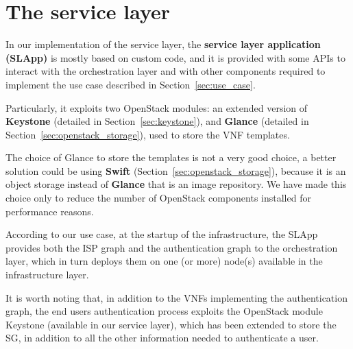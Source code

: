 \section{The service layer}
\label{sec:service_layer}

In our implementation of the service layer, the \textbf{service layer application (SLApp)} is mostly based on custom code, and it is provided with some APIs to interact with the orchestration layer and with other components required to implement the use case described in Section~\ref{sec:use_case}.

Particularly, it exploits two OpenStack modules: an extended version of \textbf{Keystone} (detailed in Section~\ref{sec:keystone}), and \textbf{Glance} (detailed in Section~\ref{sec:openstack_storage}), used to store the VNF templates.

The choice of Glance to store the templates is not a very good choice,  a better solution could be using \textbf{Swift} (Section~\ref{sec:openstack_storage}), because it is an object storage instead of \textbf{Glance} that is an image repository. We have made this choice only to reduce the number of OpenStack components installed for performance reasons.

According to our use case, at the startup of the infrastructure, the SLApp provides both the ISP graph and the authentication graph to the orchestration layer, which in turn deploys them on one (or more) node(s) available in the infrastructure layer.

It is worth noting that, in addition to the VNFs implementing the authentication graph, the end users authentication process exploits the OpenStack module Keystone (available in our service layer), which has been extended to store the SG, in addition to all the other information needed to authenticate a user.


